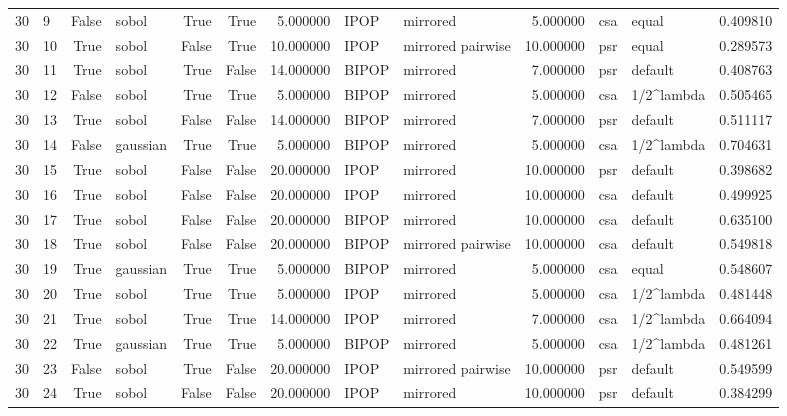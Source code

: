 \begin{tabular}{rlrlrrrllrllr}
30 & 9 & False & sobol & True & True & 5.000000 & IPOP & mirrored & 5.000000 & csa & equal & 0.409810 \\
30 & 10 & True & sobol & False & True & 10.000000 & IPOP & mirrored pairwise & 10.000000 & psr & equal & 0.289573 \\
30 & 11 & True & sobol & True & False & 14.000000 & BIPOP & mirrored & 7.000000 & psr & default & 0.408763 \\
30 & 12 & False & sobol & True & True & 5.000000 & BIPOP & mirrored & 5.000000 & csa & 1/2^lambda & 0.505465 \\
30 & 13 & True & sobol & False & False & 14.000000 & BIPOP & mirrored & 7.000000 & psr & default & 0.511117 \\
30 & 14 & False & gaussian & True & True & 5.000000 & BIPOP & mirrored & 5.000000 & csa & 1/2^lambda & 0.704631 \\
30 & 15 & True & sobol & False & False & 20.000000 & IPOP & mirrored & 10.000000 & psr & default & 0.398682 \\
30 & 16 & True & sobol & False & False & 20.000000 & IPOP & mirrored & 10.000000 & csa & default & 0.499925 \\
30 & 17 & True & sobol & False & False & 20.000000 & BIPOP & mirrored & 10.000000 & csa & default & 0.635100 \\
30 & 18 & True & sobol & False & False & 20.000000 & BIPOP & mirrored pairwise & 10.000000 & csa & default & 0.549818 \\
30 & 19 & True & gaussian & True & True & 5.000000 & BIPOP & mirrored & 5.000000 & csa & equal & 0.548607 \\
30 & 20 & True & sobol & True & True & 5.000000 & IPOP & mirrored & 5.000000 & csa & 1/2^lambda & 0.481448 \\
30 & 21 & True & sobol & True & True & 14.000000 & IPOP & mirrored & 7.000000 & csa & 1/2^lambda & 0.664094 \\
30 & 22 & True & gaussian & True & True & 5.000000 & BIPOP & mirrored & 5.000000 & csa & 1/2^lambda & 0.481261 \\
30 & 23 & False & sobol & True & False & 20.000000 & IPOP & mirrored pairwise & 10.000000 & psr & default & 0.549599 \\
30 & 24 & True & sobol & False & False & 20.000000 & IPOP & mirrored & 10.000000 & psr & default & 0.384299 \\
\bottomrule
\end{tabular}
